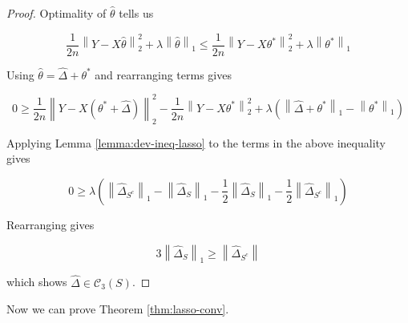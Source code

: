 \documentclass{article}
\newcommand{\cC}{\mathcal{C}}
\newcommand{\norm}[1]{\left\|#1\right\|}
\begin{document}
\begin{proof}
  Optimality of $\hat{\theta}$ tells us

  $$\frac{1}{2n}\norm{Y - X\hat{\theta}}_{2}^{2} + \lambda\norm{\hat{\theta}}_{1} \leq \frac{1}{2n}\norm{Y - X\theta^{*}}_{2}^{2} + \lambda\norm{\theta^{*}}_{1}$$

  Using $\hat{\theta} = \hat{\Delta} + \theta^{*}$ and rearranging terms gives

$$0 \geq \frac{1}{2n}\norm{Y - X(\theta^{*} + \hat{\Delta})}_{2}^{2} - \frac{1}{2n}\norm{Y - X\theta^{*}}_{2}^{2} + \lambda(\norm{\hat{\Delta} + \theta^{*}}_{1} - \norm{\theta^{*}}_{1})$$

Applying Lemma \ref{lemma:dev-ineq-lasso} to the terms in the above inequality gives

$$0 \geq \lambda\left(\norm{\hat{\Delta}_{S^{c}}}_{1} - \norm{\hat{\Delta}_{S}}_{1} - \frac12\norm{\hat{\Delta}_{S}}_{1} - \frac12\norm{\hat{\Delta}_{S^{c}}}_{1}\right)$$

Rearranging gives

$$3\norm{\hat{\Delta}_{S}}_{1} \geq \norm{\hat{\Delta}_{S^{c}}}$$

which shows $\hat{\Delta} \in \cC_{3}(S)$.

\end{proof}

Now we can prove Theorem \ref{thm:lasso-conv}.
\end{document}
